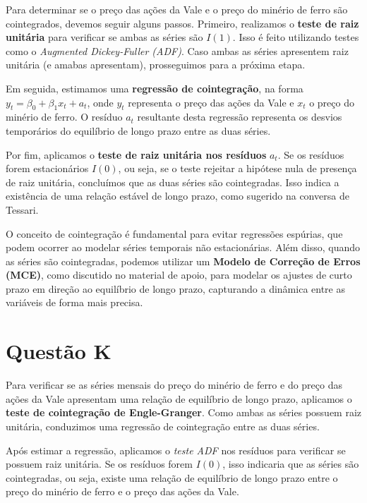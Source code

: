\documentclass[a4paper,12pt]{article}[abntex2]
\begin{document}
Para determinar se o preço das ações da Vale e o preço do minério de ferro são cointegrados, devemos seguir alguns passos. Primeiro, realizamos o \textbf{teste de raiz unitária} para verificar se ambas as séries são \(I(1)\). Isso é feito utilizando testes como o \textit{Augmented Dickey-Fuller (ADF)}. Caso ambas as séries apresentem raiz unitária (e amabas apresentam), prosseguimos para a próxima etapa.

Em seguida, estimamos uma \textbf{regressão de cointegração}, na forma \(y_t = \beta_0 + \beta_1 x_t + a_t\), onde \(y_t\) representa o preço das ações da Vale e \(x_t\) o preço do minério de ferro. O resíduo \(a_t\) resultante desta regressão representa os desvios temporários do equilíbrio de longo prazo entre as duas séries.

Por fim, aplicamos o \textbf{teste de raiz unitária nos resíduos} \(a_t\). Se os resíduos forem estacionários \(I(0)\), ou seja, se o teste rejeitar a hipótese nula de presença de raiz unitária, concluímos que as duas séries são cointegradas. Isso indica a existência de uma relação estável de longo prazo, como sugerido na conversa de Tessari.

O conceito de cointegração é fundamental para evitar regressões espúrias, que podem ocorrer ao modelar séries temporais não estacionárias. Além disso, quando as séries são cointegradas, podemos utilizar um \textbf{Modelo de Correção de Erros (MCE)}, como discutido no material de apoio, para modelar os ajustes de curto prazo em direção ao equilíbrio de longo prazo, capturando a dinâmica entre as variáveis de forma mais precisa.

\section*{\textbf{Questão K}}

Para verificar se as séries mensais do preço do minério de ferro e do preço das ações da Vale apresentam uma relação de equilíbrio de longo prazo, aplicamos o \textbf{teste de cointegração de Engle-Granger}. Como ambas as séries possuem raiz unitária, conduzimos uma regressão de cointegração entre as duas séries.

Após estimar a regressão, aplicamos o \textit{teste ADF} nos resíduos para verificar se possuem raiz unitária. Se os resíduos forem \(I(0)\), isso indicaria que as séries são cointegradas, ou seja, existe uma relação de equilíbrio de longo prazo entre o preço do minério de ferro e o preço das ações da Vale.
\end{document}
